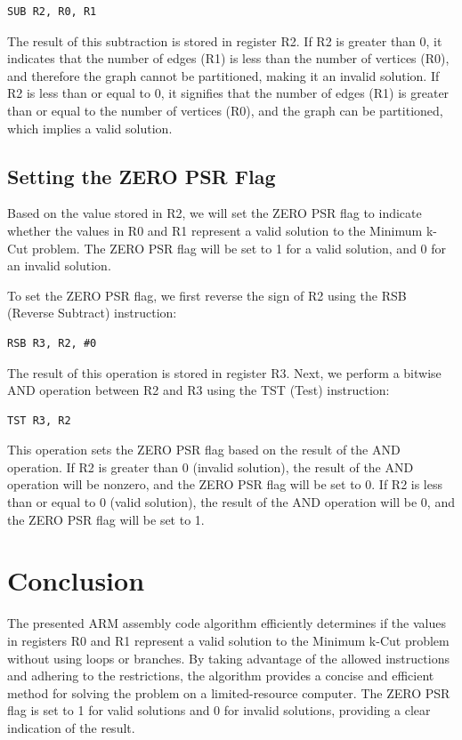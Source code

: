 \begin{verbatim}
SUB R2, R0, R1
\end{verbatim}

The result of this subtraction is stored in register R2. If R2 is greater than 0, it indicates that the number of edges (R1) is less than the number of vertices (R0), and therefore the graph cannot be partitioned, making it an invalid solution. If R2 is less than or equal to 0, it signifies that the number of edges (R1) is greater than or equal to the number of vertices (R0), and the graph can be partitioned, which implies a valid solution.

\subsection{Setting the ZERO PSR Flag}

Based on the value stored in R2, we will set the ZERO PSR flag to indicate whether the values in R0 and R1 represent a valid solution to the Minimum k-Cut problem. The ZERO PSR flag will be set to 1 for a valid solution, and 0 for an invalid solution.

To set the ZERO PSR flag, we first reverse the sign of R2 using the RSB (Reverse Subtract) instruction:

\begin{verbatim}
RSB R3, R2, #0
\end{verbatim}

The result of this operation is stored in register R3. Next, we perform a bitwise AND operation between R2 and R3 using the TST (Test) instruction:

\begin{verbatim}
TST R3, R2
\end{verbatim}

This operation sets the ZERO PSR flag based on the result of the AND operation. If R2 is greater than 0 (invalid solution), the result of the AND operation will be nonzero, and the ZERO PSR flag will be set to 0. If R2 is less than or equal to 0 (valid solution), the result of the AND operation will be 0, and the ZERO PSR flag will be set to 1.

\section{Conclusion}

The presented ARM assembly code algorithm efficiently determines if the values in registers R0 and R1 represent a valid solution to the Minimum k-Cut problem without using loops or branches. By taking advantage of the allowed instructions and adhering to the restrictions, the algorithm provides a concise and efficient method for solving the problem on a limited-resource computer. The ZERO PSR flag is set to 1 for valid solutions and 0 for invalid solutions, providing a clear indication of the result.



